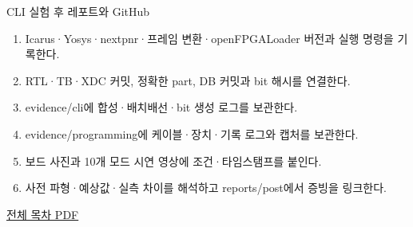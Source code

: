 \begin{frame}{CLI 실험 후 레포트와 GitHub}\relax
\small
\begin{enumerate}\setlength{\itemsep}{0.22cm}
\item Icarus·Yosys·nextpnr·프레임 변환·openFPGALoader 버전과 실행 명령을 기록한다.
\item RTL·TB·XDC 커밋, 정확한 part, DB 커밋과 bit 해시를 연결한다.
\item evidence/cli에 합성·배치배선·bit 생성 로그를 보관한다.
\item evidence/programming에 케이블·장치·기록 로그와 캡처를 보관한다.
\item 보드 사진과 10개 모드 시연 영상에 조건·타임스탬프를 붙인다.
\item 사전 파형·예상값·실측 차이를 해석하고 reports/post에서 증빙을 링크한다.
\end{enumerate}
\href{04.LAB1_00_CONTENTS.pdf}{전체 목차 PDF}
\end{frame}
\endgroup

